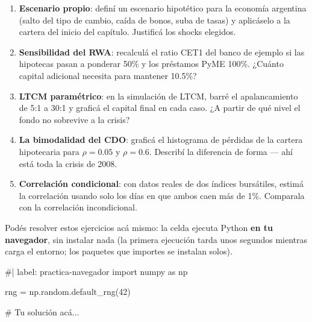 \documentclass[
  spanish,
  letterpaper,
  DIV=11,
  numbers=noendperiod]{scrreprt}
\newenvironment{Shaded}{\begin{snugshade}}{\end{snugshade}}
\newcommand{\NormalTok}[1]{\textcolor[rgb]{0.00,0.23,0.31}{#1}}
\providecommand{\tightlist}{%
  \setlength{\itemsep}{0pt}\setlength{\parskip}{0pt}}
\begin{document}
\begin{tcolorbox}[enhanced jigsaw, bottomrule=.15mm, colback=white, opacitybacktitle=0.6, arc=.35mm, toprule=.15mm, opacityback=0, breakable, titlerule=0mm, left=2mm, coltitle=black, colbacktitle=quarto-callout-important-color!10!white, colframe=quarto-callout-important-color-frame, leftrule=.75mm, toptitle=1mm, bottomtitle=1mm, title=\textcolor{quarto-callout-important-color}{\faExclamation}\hspace{0.5em}{Ejercicios}, rightrule=.15mm]

\begin{enumerate}
\def\labelenumi{\arabic{enumi}.}
\tightlist
\item
  \textbf{Escenario propio}: definí un escenario hipotético para la
  economía argentina (salto del tipo de cambio, caída de bonos, suba de
  tasas) y aplicáselo a la cartera del inicio del capítulo. Justificá
  los shocks elegidos.
\item
  \textbf{Sensibilidad del RWA}: recalculá el ratio CET1 del banco de
  ejemplo si las hipotecas pasan a ponderar 50\% y los préstamos PyME
  100\%. ¿Cuánto capital adicional necesita para mantener 10.5\%?
\item
  \textbf{LTCM paramétrico}: en la simulación de LTCM, barré el
  apalancamiento de 5:1 a 30:1 y graficá el capital final en cada caso.
  ¿A partir de qué nivel el fondo no sobrevive a la crisis?
\item
  \textbf{La bimodalidad del CDO}: graficá el histograma de pérdidas de
  la cartera hipotecaria para \(\rho = 0.05\) y \(\rho = 0.6\). Describí
  la diferencia de forma --- ahí está toda la crisis de 2008.
\item
  \textbf{Correlación condicional}: con datos reales de dos índices
  bursátiles, estimá la correlación usando solo los días en que ambos
  caen más de 1\%. Comparala con la correlación incondicional.
\end{enumerate}

\end{tcolorbox}

Podés resolver estos ejercicios acá mismo: la celda ejecuta Python
\textbf{en tu navegador}, sin instalar nada (la primera ejecución tarda
unos segundos mientras carga el entorno; los paquetes que importes se
instalan solos).

\begin{Shaded}
\begin{Highlighting}[]
\NormalTok{\#| label: practica{-}navegador}
\NormalTok{import numpy as np}

\NormalTok{rng = np.random.default\_rng(42)}

\NormalTok{\# Tu solución acá...}
\end{Highlighting}
\end{Shaded}
\end{document}

